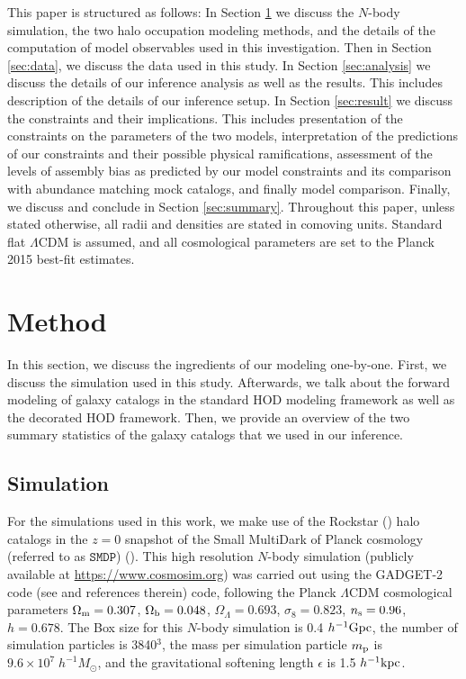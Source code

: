 \documentclass[12pt, preprint]{aastex}
\begin{document}
This paper is structured as follows: In Section \ref{sec:method} we discuss the $N$-body simulation, the two halo occupation modeling methods, and the details of the computation of model observables used in this investigation. Then in Section \ref{sec:data}, we discuss the data used in this study. 
In Section \ref{sec:analysis} we discuss the details of our inference analysis as well as the results. This includes description of the details of our inference setup. In Section \ref{sec:result} we discuss the constraints and their implications. This includes presentation of the constraints on the parameters of the two models, interpretation of the predictions of our constraints and their possible physical ramifications, assessment of the levels of assembly bias as predicted by our model constraints and its comparison with abundance matching mock catalogs, and finally model comparison. Finally, we discuss and conclude in Section \ref{sec:summary}.
Throughout this paper, unless stated otherwise, 
all radii and densities are stated in comoving units. 
Standard flat $\Lambda$CDM is assumed, and all cosmological 
parameters are set to the Planck 2015 best-fit estimates.

\section{Method}\label{sec:method}

In this section, we discuss the ingredients of our modeling one-by-one. First, we discuss the simulation used in this study. Afterwards, we talk about the forward modeling of galaxy catalogs in the standard HOD modeling framework as well as the decorated HOD framework. Then, we provide an overview of the two summary statistics of the galaxy catalogs that we used in our inference.  

\subsection{Simulation}

For the simulations used in this work, we make use of the Rockstar (\citealt{rockstar}) halo catalogs in the $z=0$ snapshot of the Small MultiDark of Planck cosmology (referred to as $\mathtt{SMDP}$) (\citealt{smallmultidark}). This high resolution $N$-body simulation (publicly available at \url{https://www.cosmosim.org}) was carried out using the GADGET-2 code 
(see \citealt{smallmultidark} and references therein) code, following the Planck $\Lambda$CDM cosmological parameters 
$\Omega_{\rm m} = 0.307$, $\Omega_{\rm b} = 0.048$, $\Omega_{\Lambda} = 0.693$, $\sigma_{8} = 0.823$, $n_{\rm s}=0.96$, 
$h=0.678$. The Box size for this $N$-body simulation is 0.4 $h^{-1} \rm{Gpc}$, the number of simulation particles is 3840$^3$, the mass per simulation particle $m_{\rm p}$ is $9.6 \times 10^{7} \; h^{-1} M_{\odot}$, and the gravitational softening length $\epsilon$ is 1.5 $h^{-1} \rm{kpc}$.
\end{document}
